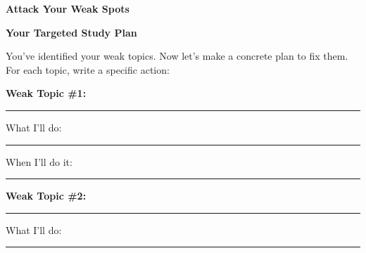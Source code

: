 \clearpage
\thispagestyle{empty}
{\sffamily

\begin{center}
{\fontsize{22}{26}\selectfont\bfseries\color{funRed} \faBullseye\hspace{3mm}Attack Your Weak Spots\hspace{3mm}\faBullseye}

\vspace{2mm}
{\color{funGray}\hrulefill}
\end{center}

\vspace{3mm}

\begin{tcolorbox}[
    enhanced,
    colback=funRedLight,
    colframe=funRed!40,
    arc=10pt,
    boxrule=1.5pt,
    left=6mm, right=6mm, top=5mm, bottom=5mm,
]
{\large\bfseries\color{funRedDark} \faMicroscope\hspace{2mm}Your Targeted Study Plan}

\vspace{2mm}

You've identified your weak topics. Now let's make a concrete plan to fix them. For each topic, write a specific action:

\vspace{3mm}

\textbf{Weak Topic \#1:} \rule[-2pt]{5.5cm}{0.5pt}

\vspace{1mm}

\hspace{5mm}\textcolor{funRed}{\faArrowRight}\hspace{2mm}What I'll do: \rule[-2pt]{5.5cm}{0.5pt}

\vspace{1mm}

\hspace{5mm}\textcolor{funRed}{\faArrowRight}\hspace{2mm}When I'll do it: \rule[-2pt]{5cm}{0.5pt}

\vspace{3mm}

\textbf{Weak Topic \#2:} \rule[-2pt]{5.5cm}{0.5pt}

\vspace{1mm}

\hspace{5mm}\textcolor{funRed}{\faArrowRight}\hspace{2mm}What I'll do: \rule[-2pt]{5.5cm}{0.5pt}


\end{tcolorbox}}

